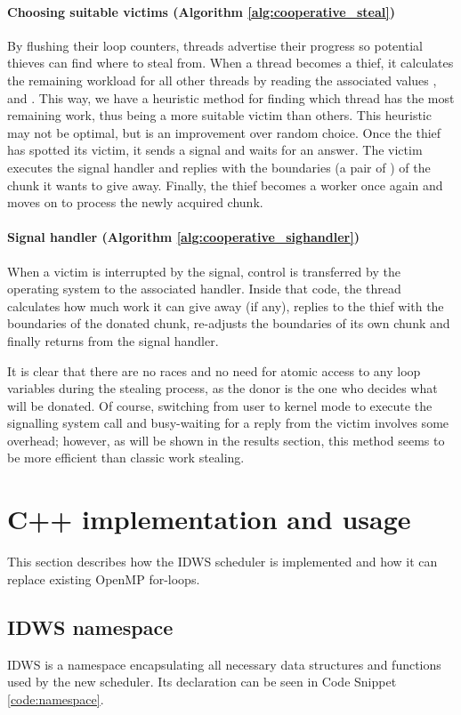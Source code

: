 \documentclass{acm_proc_article-sp}
\begin{document}
\paragraph{Choosing suitable victims (Algorithm \ref{alg:cooperative_steal})}
By flushing their loop counters, threads advertise their progress so potential 
thieves can find where to steal from. When a thread becomes a thief, it 
calculates the remaining workload for all other threads by reading the 
associated values ,  and . This way, we 
have a heuristic method for finding which thread has the most remaining work, 
thus being a more suitable victim than others. This heuristic may not be 
optimal, but is an improvement over random choice. Once the thief has spotted 
its victim, it sends a signal and waits for an answer. The victim executes the 
signal handler and replies with the boundaries (a pair of ) of the chunk it wants to give away. Finally, the thief becomes a 
worker once again and moves on to process the newly acquired chunk.

\paragraph{Signal handler (Algorithm \ref{alg:cooperative_sighandler})}
When a victim is interrupted by the signal, control is transferred by the 
operating system to the associated handler. Inside that code, the thread 
calculates how much work it can give away (if any), replies to the thief with 
the boundaries of the donated chunk, re-adjusts the boundaries of its own chunk 
and finally returns from the signal handler.

It is clear that there are no races and no need for atomic access to any loop
variables during the stealing process, as the donor is the one who decides what
will be donated. Of course, switching from user to kernel mode to execute the
signalling system call and busy-waiting for a reply from the victim involves some
overhead; however, as will be shown in the results section, this method seems to
be more efficient than classic work stealing.


\section{C++ implementation and usage}
\label{sect:implementation}
This section describes how the IDWS scheduler is implemented and how it can 
replace existing OpenMP for-loops.

\subsection{IDWS namespace}
\label{subsect:namespace}
IDWS is a namespace encapsulating all necessary data structures and functions 
used by the new scheduler. Its declaration can be seen in Code Snippet 
\ref{code:namespace}.
\end{document}
